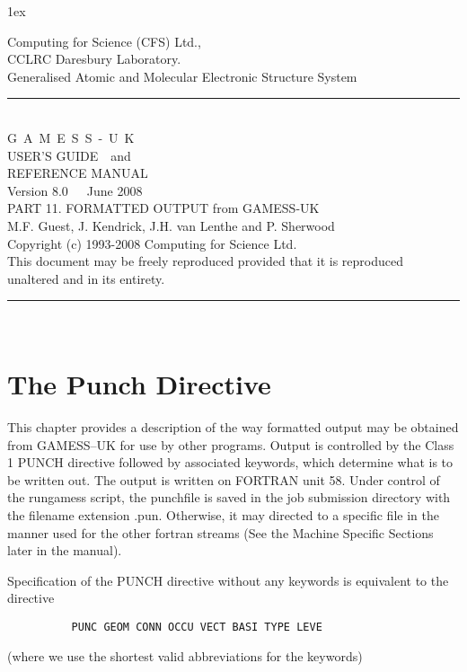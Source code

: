 \documentclass[11pt,fleqn]{article}
\begin{document}
\sf
\parindent 0cm
\parskip 1ex
\begin{flushleft}
 
Computing for Science (CFS) Ltd.,\\CCLRC Daresbury Laboratory.\\[0.30in]
{\large Generalised Atomic and Molecular Electronic Structure System }\\[.2in]
\rule{150mm}{3mm}\\
\vspace{.2in}
{\huge G~A~M~E~S~S~-~U~K}\\[.3in]
{\huge USER'S GUIDE~~and}\\[.2in]
{\huge REFERENCE MANUAL}\\[0.2in]
{\huge Version 8.0~~~June 2008}\\ [.2in]
{\large PART 11. FORMATTED OUTPUT from GAMESS-UK}\\
\vspace{.1in}
{\large M.F. Guest, J. Kendrick, J.H. van Lenthe and P. Sherwood}\\[0.2in]
 
Copyright (c) 1993-2008 Computing for Science Ltd.\\[.1in]
This document may be freely reproduced provided that it is reproduced\\
unaltered and in its entirety.\\
\vspace{.2in}
\rule{150mm}{3mm}\\
\end{flushleft}

% 
\tableofcontents
{}
\newpage


\section[The Punch Directive]{The Punch Directive}

This chapter provides a description of the way formatted output may be
obtained from GAMESS--UK for use by other programs.  Output is
controlled by the Class 1 PUNCH directive followed by associated
keywords, which determine what is to be written out.  The output is
written on FORTRAN unit 58. Under control of the rungamess script, the
punchfile is saved in the job submission directory with the filename 
extension .pun.  Otherwise, it may directed to a specific file in the manner
used for the other fortran streams (See the Machine Specific Sections
later in the manual).

Specification of the PUNCH directive without any keywords is
equivalent to the directive 
{
\footnotesize
\begin{verbatim}
          PUNC GEOM CONN OCCU VECT BASI TYPE LEVE
\end{verbatim} 
}
(where we use the shortest valid abbreviations for the keywords)
\end{document}
